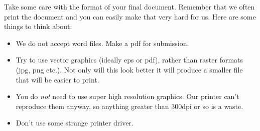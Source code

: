 Take some care with the format of your final document. Remember that we often print the document and you can easily make that very hard for us. Here
are some things to think about:
\begin{itemize}
  \item We do not accept word files. Make a pdf for submission.
  \item Try to use vector graphics (ideally eps or pdf), rather than raster
  formats (jpg, png etc.).
  Not only will this look better it will produce a smaller file that will be
  easier to print.
  \item You do \emph{not} need to use super high resolution graphics. Our
  printer can't reproduce them anyway, so anything greater than 300dpi or so is
  a waste.
  \item Don't use some strange printer driver.
\end{itemize}

